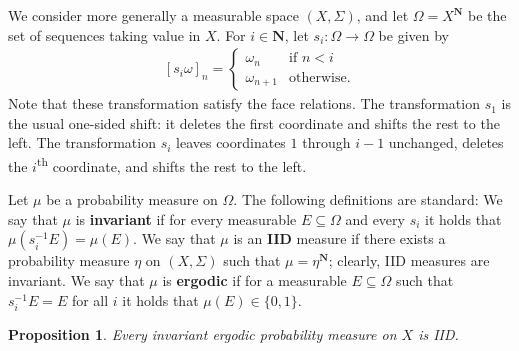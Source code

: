 \documentclass[12pt, pdflatex]{amsart}
\newtheorem{proposition}[theorem]{Proposition}
\theoremstyle{definition}
\numberwithin{equation}{section}
\numberwithin{theorem}{section}
\newcommand{\NN}{\mathbf{N}}
\begin{document}
\medskip
We consider more generally a measurable space $(X,\Sigma)$, and let $\Omega = X^\NN$ be the set of sequences taking value in $X$. For $i \in \NN$, let $s_i \colon \Omega \to \Omega$ be given by
\begin{align}
    \label{eq:deletion}
    [s_i \omega]_n = 
    \begin{cases}
        \omega_n&\text{if } n<i \\
        \omega_{n+1}&\text{otherwise.}
    \end{cases}
\end{align}
Note that these transformation satisfy the face relations. The transformation $s_1$ is the usual one-sided shift: it deletes the first coordinate and shifts the rest to the left. The transformation $s_i$ leaves coordinates $1$ through $i-1$ unchanged, deletes the $i$\textsuperscript{th} coordinate, and shifts the rest to the left. 

Let $\mu$ be a probability measure on $\Omega$. The following definitions are standard: We say that $\mu$ is \textbf{invariant} if for every measurable $E \subseteq \Omega$ and every $s_i$ it holds that $\mu(s_i^{-1} E) = \mu(E)$. We say that $\mu$ is an  \textbf{IID} measure if there exists a probability measure $\eta$ on  $(X,\Sigma)$ such that $\mu = \eta^\NN$; clearly, IID measures are invariant. We say that $\mu$ is \textbf{ergodic} if for a measurable $E \subseteq \Omega$ such that $s_i^{-1}E=E$ for all $i$ it holds that $\mu(E) \in \{0,1\}$.
\begin{proposition}
    \label{prop:ergodic}
    Every invariant ergodic probability measure on $X$ is IID.
\end{proposition}
\end{document}
